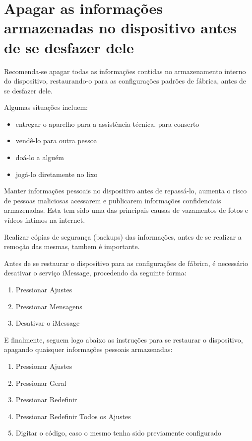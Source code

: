 \section{Apagar as informa\c c\~oes armazenadas no dispositivo antes de se desfazer dele}

Recomenda-se apagar todas as informa\c c\~oes contidas no armazenamento interno do dispositivo, restaurando-o para as configura\c c\~oes padr\~oes de f\'abrica, antes de se desfazer dele. 

Algumas situa\c c\~oes incluem:

\begin{itemize}
\item entregar o aparelho para a assist\^encia t\'ecnica, para conserto
\item vend\^e-lo para outra pessoa
\item do\'a-lo a algu\'em
\item jog\'a-lo diretamente no lixo
\end{itemize}

Manter informa\c c\~oes pessoais no dispositivo antes de repass\'a-lo, aumenta o risco de pessoas maliciosas acessarem e publicarem informa\c c\~oes confidenciais armazenadas. Esta tem sido uma das principais causas de vazamentos de fotos e v\'ideos \'intimos na internet. 

Realizar c\'opias de seguran\c ca (backups) das informa\c c\~oes, antes de se realizar a remo\c c\~ao das mesmas, tambem \'e importante.

Antes de se restaurar o dispositivo para as configura\c c\~oes de f\'abrica, \'e necess\'ario desativar o servi\c co iMessage, procedendo da seguinte forma:

\begin{enumerate}
\item Pressionar Ajustes
\item Pressionar Mensagens
\item Desativar o iMessage
\end{enumerate}

E finalmente, seguem logo abaixo as instru\c c\~oes para se restaurar o dispositivo, apagando quaisquer informa\c c\~oes pessoais armazenadas:

\begin{enumerate}
\item Pressionar Ajustes
\item Pressionar Geral
\item Pressionar Redefinir
\item Pressionar Redefinir Todos os Ajustes
\item Digitar o c\'odigo, caso o mesmo tenha sido previamente configurado
\end{enumerate}
